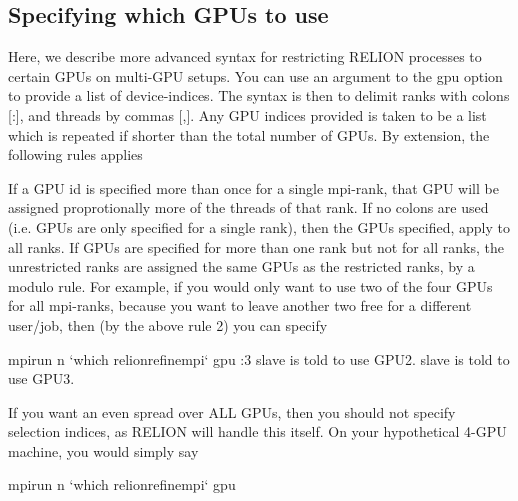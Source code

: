 \documentclass[letterpaper,10pt,english]{sphinxmanual}
\begin{document}
\subsection{Specifying which GPUs to use}
\label{\detokenize{relion:specifying-which-gpus-to-use}}

Here, we describe more advanced syntax for restricting RELION processes to certain GPUs on multi-GPU setups. You can use an argument to the \textendash{}gpu option to provide a list of device-indices. The syntax is then to delimit ranks with colons {[}:{]}, and threads by commas {[},{]}. Any GPU indices provided is taken to be a list which is repeated if shorter than the total number of GPUs. By extension, the following rules applies

If a GPU id is specified more than once for a single mpi-rank, that GPU will be assigned proprotionally more of the threads of that rank.
If no colons are used (i.e. GPUs are only specified for a single rank), then the GPUs specified, apply to all ranks.
If GPUs are specified for more than one rank but not for all ranks, the unrestricted ranks are assigned the same GPUs as the restricted ranks, by a modulo rule.
For example, if you would only want to use two of the four GPUs for all mpi-ranks, because you want to leave another two free for a different user/job, then (by the above rule 2) you can specify

\begin{sphinxVerbatim}[commandchars=\\\{\}]
mpirun \PYGZhy{}n  ‘which relion\PYGZus{}refine\PYGZus{}mpi‘ \PYGZhy{}\PYGZhy{}gpu :3
slave  is told to use GPU2. slave  is told to use GPU3.
\end{sphinxVerbatim}

If you want an even spread over ALL GPUs, then you should not specify selection indices, as RELION will handle this itself. On your hypothetical 4-GPU machine, you would simply say

\begin{sphinxVerbatim}[commandchars=\\\{\}]
mpirun \PYGZhy{}n  ‘which relion\PYGZus{}refine\PYGZus{}mpi‘ \PYGZhy{}\PYGZhy{}gpu
\end{sphinxVerbatim}
\end{document}
